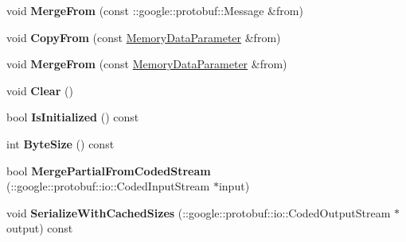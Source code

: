 \begin{DoxyCompactItemize}
\item 
\mbox{\label{classcaffe_1_1_memory_data_parameter_a74afd6f394f2471ff763a4633082220a}} 
void {\bfseries Merge\+From} (const \+::google\+::protobuf\+::\+Message \&from)
\item 
\mbox{\label{classcaffe_1_1_memory_data_parameter_aab3bd574e957cdbfe0e7288d0f29cd56}} 
void {\bfseries Copy\+From} (const \mbox{\hyperlink{classcaffe_1_1_memory_data_parameter}{Memory\+Data\+Parameter}} \&from)
\item 
\mbox{\label{classcaffe_1_1_memory_data_parameter_a5e830b2488cc67b8b1c345b3b3ae753f}} 
void {\bfseries Merge\+From} (const \mbox{\hyperlink{classcaffe_1_1_memory_data_parameter}{Memory\+Data\+Parameter}} \&from)
\item 
\mbox{\label{classcaffe_1_1_memory_data_parameter_a58eb7b6ef025e70fde2b6a270cfa7c25}} 
void {\bfseries Clear} ()
\item 
\mbox{\label{classcaffe_1_1_memory_data_parameter_acfa32cd1f9f06d66bd6f8ab803a9dc92}} 
bool {\bfseries Is\+Initialized} () const
\item 
\mbox{\label{classcaffe_1_1_memory_data_parameter_a057b61e829db73165267bf042ee7f9f2}} 
int {\bfseries Byte\+Size} () const
\item 
\mbox{\label{classcaffe_1_1_memory_data_parameter_a7ca66e7cfb221f0907ef988a839e67bf}} 
bool {\bfseries Merge\+Partial\+From\+Coded\+Stream} (\+::google\+::protobuf\+::io\+::\+Coded\+Input\+Stream $\ast$input)
\item 
\mbox{\label{classcaffe_1_1_memory_data_parameter_af3e810e9561161452424c923dbfc349d}} 
void {\bfseries Serialize\+With\+Cached\+Sizes} (\+::google\+::protobuf\+::io\+::\+Coded\+Output\+Stream $\ast$output) const
\item 
\mbox{\label{classcaffe_1_1_memory_data_parameter_a4d4af03f08562fdc41051460b585654b}} 

\end{DoxyCompactItemize}
